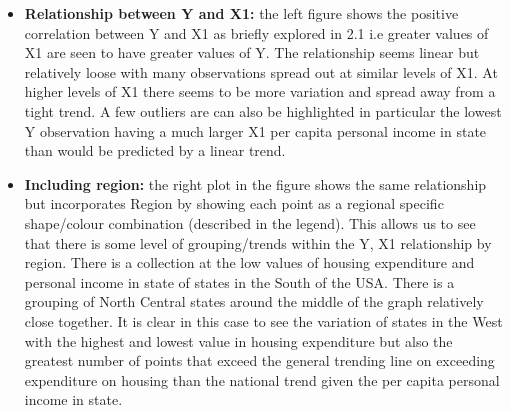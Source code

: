\documentclass[12pt,letterpaper]{article}
\begin{document}
\begin{itemize}
	\item \textbf{Relationship between Y and X1:} the left figure shows the positive correlation between Y and X1 as briefly explored in 2.1 i.e greater values of X1 are seen to have greater values of Y.  The relationship seems linear but relatively loose with many observations spread out at similar levels of X1. At higher levels of X1 there seems to be more variation and spread away from a tight trend.  A few outliers are can also be highlighted in particular the lowest Y observation having a much larger X1 per capita personal income in state than would be predicted by a linear trend.
	\item \textbf{Including region: } the right plot in the figure shows the same relationship but incorporates Region by showing each point as a regional specific shape/colour combination (described in the legend).  This allows us to see that there is some level of grouping/trends within the Y, X1 relationship by region. There is a collection at the low values of housing expenditure and personal income in state of states in the South of the USA. There is a grouping of North Central states around the middle of the graph relatively close together. It is clear in this case to see the variation of states in the West with the highest and lowest value in housing  expenditure but also the greatest number of points that exceed the general trending line on exceeding expenditure on housing than the national trend given the per capita personal income in state.
\end{itemize}
\end{document}
